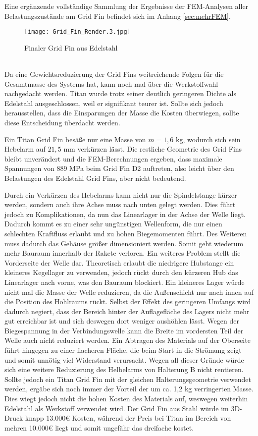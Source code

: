 Eine ergänzende vollständige Sammlung der Ergebnisse der FEM-Analysen aller Belastungszustände am Grid Fin befindet sich im Anhang \ref{sec:mehrFEM}.
\begin{figure}[h] 
	\centering
	\texttt{[image: Grid\_Fin\_Render.3.jpg]}
	\caption{Finaler Grid Fin aus Edelstahl}
	\label{abb_rendering1}
\end{figure}\\
Da eine Gewichtsreduzierung der Grid Fins weitreichende Folgen für die Gesamtmasse des Systems hat, kann noch mal über die Werkstoffwahl nachgedacht werden. Titan wurde trotz seiner deutlich geringeren Dichte als Edelstahl ausgeschlossen, weil er signifikant teurer ist. Sollte sich jedoch herausstellen, dass die Einsparungen der Masse die Kosten überwiegen, sollte diese Entscheidung überdacht werden.

Ein Titan Grid Fin besäße nur eine Masse von $m=1,6$ kg, wodurch sich sein Hebelarm auf $21,5$ mm verkürzen lässt. Die restliche Geometrie des Grid Fins bleibt unverändert und die FEM-Berechnungen ergeben, dass maximale Spannungen von $889$ MPa beim Grid Fin D2 auftreten, also leicht über den Belastungen des Edelstahl Grid Fins, aber nicht bedeutend.

Durch ein Verkürzen des Hebelarms kann nicht nur die Spindelstange kürzer werden, sondern auch ihre Achse muss nach unten gelegt werden. Dies führt jedoch zu Komplikationen, da nun das Linearlager in der Achse der Welle liegt. Dadurch kommt es zu einer sehr ungünstigen Wellenform, die nur einen schlechten Kraftfluss erlaubt und zu hohen Biegemomenten führt. Des Weiteren muss dadurch das Gehäuse größer dimensioniert werden. Somit geht wiederum mehr Bauraum innerhalb der Rakete verloren. Ein weiteres Problem stellt die Vorderseite der Welle dar. Theoretisch erlaubt die niedrigere Hubstange ein kleineres Kegellager zu verwenden, jedoch rückt durch den kürzeren Hub das Linearlager nach vorne, was den Bauraum blockiert. Ein kleineres Lager würde nicht mal die Masse der Welle reduzieren, da die Außenschicht nur nach innen auf die Position des Hohlraums rückt. Selbst der Effekt des geringeren Umfangs wird dadurch negiert, dass der Bereich hinter der Auflagefläche des Lagers nicht mehr gut erreichbar ist und sich deswegen dort weniger aushöhlen lässt. Wegen der Biegespannung in der Verbindungswelle kann die Breite im vordersten Teil der Welle auch nicht reduziert werden. Ein Abtragen des Materials auf der Oberseite führt hingegen zu einer flacheren Fläche, die beim Start in die Strömung zeigt und somit unnötig viel Widerstand verursacht. Wegen all dieser Gründe würde sich eine weitere Reduzierung des Helbelarms von Halterung B nicht rentieren. Sollte jedoch ein Titan Grid Fin mit der gleichen Halterungsgeometrie verwendet werden, ergäbe sich noch immer der Vorteil der um ca. 1,2 kg verringerten Masse. Dies wiegt jedoch nicht die hohen Kosten des Materials auf, weswegen weiterhin Edelstahl als Werkstoff verwendet wird. Der Grid Fin aus Stahl würde im 3D-Druck knapp 13.000€ Kosten, während der Preis bei Titan im Bereich von mehren 10.000€ liegt und somit ungefähr das dreifache kostet.
